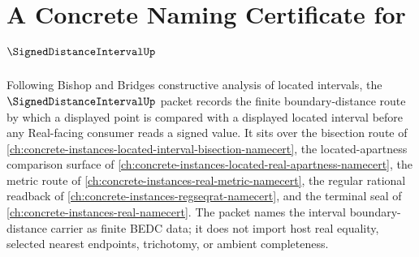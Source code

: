 \chapter{A Concrete Naming Certificate for $\SignedDistanceIntervalUp$}
\label{ch:concrete-instances-signed-distance-interval-namecert}

Following Bishop and Bridges constructive analysis of located intervals, the $\SignedDistanceIntervalUp$ packet records the finite boundary-distance route by which a displayed point is compared with a displayed located interval before any Real-facing consumer reads a signed value. It sits over the bisection route of \autoref{ch:concrete-instances-located-interval-bisection-namecert}, the located-apartness comparison surface of \autoref{ch:concrete-instances-located-real-apartness-namecert}, the metric route of \autoref{ch:concrete-instances-real-metric-namecert}, the regular rational readback of \autoref{ch:concrete-instances-regseqrat-namecert}, and the terminal seal of \autoref{ch:concrete-instances-real-namecert}. The packet names the interval boundary-distance carrier as finite BEDC data; it does not import host real equality, selected nearest endpoints, trichotomy, or ambient completeness.

